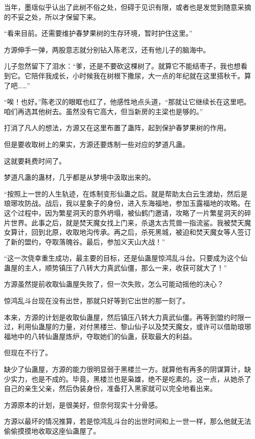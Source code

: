 \begin{this_body}
当年，墨瑶似乎认出了此树不俗之处，但碍于见识有限，或者也是发觉到随意采摘的不妥之处，所以才保留下来。

“看来目前。还需要维护春梦果树的生存环境，暂时护住这里。”

方源伸手一弹，两股意志就分别钻入陈老汉，还有他儿子的脑海中。

儿子忽然留下了泪水：“爹，还是不要砍这棵树了。就算它不能结枣子，我也想看到它。它陪伴我成长，小时候我在树根下撒尿，大一点的年纪就在这里搭秋千。算了吧……”

“唉！也好。”陈老汉的眼眶也红了，他感性地点头道，“那就让它继续长在这里吧。咱们再选其他树去。虽然没有它高大，但当新房的主梁也是够的。”

打消了凡人的想法，方源又在这里布置了蛊阵，起到保护春梦果树的作用。

但是要收取树上的果实，方源还要炼制一些对应的梦道凡蛊。

这就要耗费时间了。

梦道凡蛊的蛊材，几乎都是从梦境中汲取出来的。

“按照上一世的人生轨迹，在炼制变形仙蛊之后。就是帮助太白云生渡劫，然后是琅琊攻防战。战后，我以星象子的身份，进入东海福地，参加玉露福地的攻略。在这个过程中，因为繁星洞天的意外坍塌，被仙鹤门邀请，攻略了一片繁星洞天的碎片世界。此事之后，就是焚天魔女找上门来，杀退太古荒兽一指流鲨。我被焚天魔女算计，回到北原，收取地沟传承。再之后，杀死黑城，被迫和焚天魔女等人签订了新的盟约，夺取落魄谷。最后，参加义天山大战！”

“这一次侥幸重生成功，最主要的目标，还是仙蛊屋惊鸿乱斗台。只要成为这个仙蛊屋的主人，顺势镇压了八转大力真武仙僵，那么一来，收获可就大了！”

方源虽然提前收取仙蛊屋失败了，但一次失败，怎么可能动摇他的决心？

惊鸿乱斗台现在没有出世，那就只好等到它出世的那一刻了。

本来，方源的计划是收取仙蛊屋，然后镇压八转大力真武仙僵。再等到盟约时限一过，利用仙蛊屋的力量，对付黑楼兰、黎山仙子以及焚天魔女，或许可以借助琅琊福地中的八转仙蛊屋炼炉，夺取她们的仙蛊，获取最大的利益。

但现在不行了。

缺少了仙蛊屋，方源的能力很明显弱于黑楼兰一方。就算他有再多的阴谋算计，缺少实力，也是不成的。毕竟，黑楼兰也是枭雄，绝不是吃素的。这一点，从她杀了自己的亲生父亲，然后伪装身份，准备打入黑家就可以完全地看出来。

方源原本的计划，是很美好，但奈何现实十分骨感。

方源以最坏的情况推算，若是惊鸿乱斗台的出世时间和上一世一样，那么他就无法偷偷摸摸地收取这座仙蛊屋了。


\end{this_body}
